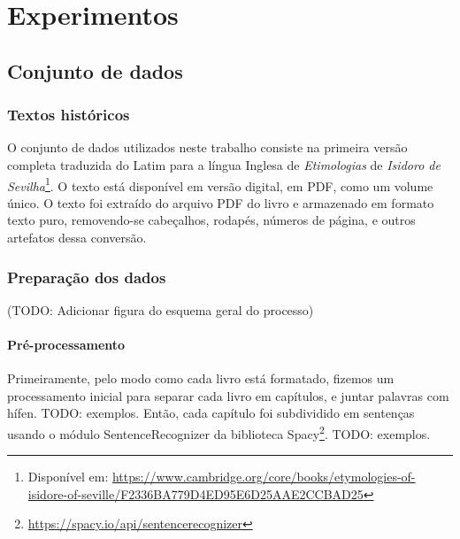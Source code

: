
\chapter{Experimentos}

\section{Conjunto de dados}
\subsection{Textos históricos}
O conjunto de dados utilizados neste trabalho consiste na primeira versão completa traduzida do Latim para a língua Inglesa de \textit{Etimologias} de \textit{Isidoro de Sevilha}\footnote{Disponível em: \url{https://www.cambridge.org/core/books/etymologies-of-isidore-of-seville/F2336BA779D4ED95E6D25AAE2CCBAD25} }. O texto está disponível em versão digital, em PDF, como um volume único.
O texto foi extraído do arquivo PDF do livro e armazenado em formato texto puro, removendo-se cabeçalhos, rodapés, números de página, e outros artefatos dessa conversão.

\subsection{Preparação dos dados}
(TODO: Adicionar figura do esquema geral do processo)
\subsubsection{Pré-processamento}
Primeiramente, pelo modo como cada livro está formatado, fizemos um processamento inicial para separar cada livro em capítulos, e juntar palavras com hífen. TODO: exemplos.
Então, cada capítulo foi subdividido em sentenças usando o módulo SentenceRecognizer da biblioteca Spacy\footnote{\url{https://spacy.io/api/sentencerecognizer} }. TODO: exemplos.

